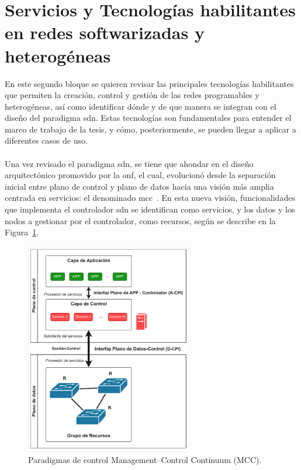 \section{Servicios y Tecnologías habilitantes en redes softwarizadas y heterogéneas}
\label{sec:tecnologias_habilitantes}

En este segundo bloque se quieren revisar las principales tecnologías habilitantes que permiten la creación, control y gestión de las redes programables y heterogéneas, así como identificar dónde y de que manera se integran con el diseño del paradigma \gls{sdn}. Estas tecnologías son fundamentales para entender el marco de trabajo de la tesis, y cómo, posteriormente, se pueden llegar a aplicar a diferentes casos de uso.\\
\\
Una vez revisado el paradigma \gls{sdn}, se tiene que ahondar en el diseño arquitectónico promovido por la \gls{onf}, el cual, evolucionó desde la separación inicial entre plano de control y plano de datos hacia una visión más amplia centrada en servicios: el denominado \gls{mcc}~\cite{ONF2016}. En esta nueva visión, funcionalidades que implementa el controlador \gls{sdn} se identifican como servicios, y los datos y los nodos a gestionar por el controlador, como recursos, según se describe en la Figura~\ref{fig:sota_6_sdn_arch_mcc}. 

\begin{figure}[ht!]
\centering
\includegraphics[width=0.65\textwidth]{fig/02_sota/sota_6_sdn_arch_mcc.drawio.pdf}
\caption{Paradigmas de control Management–Control Continuum (MCC).}
\label{fig:sota_6_sdn_arch_mcc}
\end{figure}

